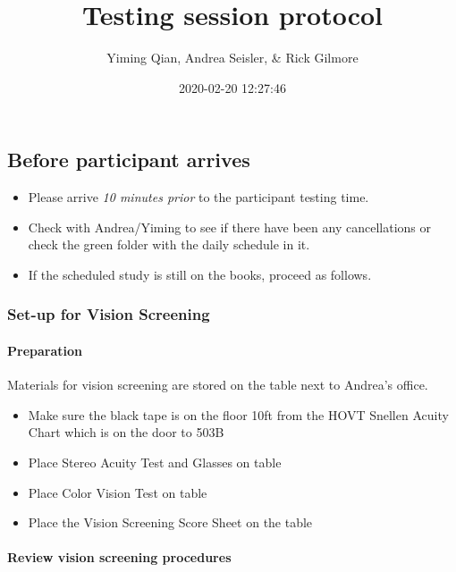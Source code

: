 \documentclass[]{article}
\title{Testing session protocol}
\author{Yiming Qian, Andrea Seisler, \& Rick Gilmore}
\date{2020-02-20 12:27:46}
\providecommand{\tightlist}{%
  \setlength{\itemsep}{0pt}\setlength{\parskip}{0pt}}
\let\oldparagraph\paragraph
\renewcommand{\paragraph}[1]{\oldparagraph{#1}\mbox{}}
\begin{document}
\maketitle

{
\setcounter{tocdepth}{3}
\tableofcontents
}
\hypertarget{before-participant-arrives}{%
\subsection{Before participant
arrives}\label{before-participant-arrives}}

\begin{itemize}
\tightlist
\item
  Please arrive \emph{10 minutes prior} to the participant testing time.
\item
  Check with Andrea/Yiming to see if there have been any cancellations
  or check the green folder with the daily schedule in it.
\item
  If the scheduled study is still on the books, proceed as follows.
\end{itemize}

\hypertarget{set-up-for-vision-screening}{%
\subsubsection{Set-up for Vision
Screening}\label{set-up-for-vision-screening}}

\hypertarget{preparation}{%
\paragraph{Preparation}\label{preparation}}

Materials for vision screening are stored on the table next to Andrea's
office.

\begin{itemize}
\tightlist
\item
  Make sure the black tape is on the floor 10ft from the HOVT Snellen
  Acuity Chart which is on the door to 503B
\item
  Place Stereo Acuity Test and Glasses on table
\item
  Place Color Vision Test on table
\item
  Place the Vision Screening Score Sheet on the table
\end{itemize}

\hypertarget{review-vision-screening-procedures}{%
\paragraph{Review vision screening
procedures}\label{review-vision-screening-procedures}}
\end{document}
